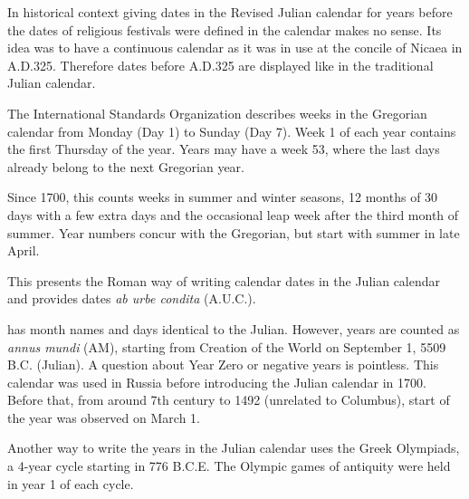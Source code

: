 \begin{description}
  In historical context giving dates in the Revised Julian calendar
  for years before the dates of religious festivals were defined in
  the calendar makes no sense. Its idea was to have a continuous
  calendar as it was in use at the concile of Nicaea in
  A.D.325. Therefore dates before A.D.325 are displayed like in the
  traditional Julian calendar.
\item[ISO Week] The International Standards Organization describes
  weeks in the Gregorian calendar from Monday (Day 1) to Sunday (Day
  7). Week 1 of each year contains the first Thursday of the
  year. Years may have a week 53, where the last days already belong
  to the next Gregorian year.
\item[Icelandic calendar] Since 1700, this counts weeks in summer and
  winter seasons, 12 months of 30 days with a few extra days and the
  occasional leap week after the third month of summer. Year numbers
  concur with the Gregorian, but start with summer in late April.
\item[Roman calendar] This presents the Roman way of writing calendar
  dates in the Julian calendar and provides dates \emph{ab urbe condita} (A.U.C.).
\item[Byzantine Calendar] has month names and days identical to the Julian.  
  However, years are counted as \emph{annus mundi} (AM), 
  starting from Creation of the World on September 1, 5509 B.C. (Julian). 
  A question about Year Zero or negative years is pointless. 
  This calendar was used in Russia before introducing the Julian calendar in 1700. 
  Before that, from around 7th century to 1492 (unrelated to Columbus), start of the year was observed on March 1.
\item[Olympic calendar] Another way to write the years in the Julian
  calendar uses the Greek Olympiads, a 4-year cycle starting in 776
  B.C.E. The Olympic games of antiquity were held in year 1 of each cycle.
\end{description}

